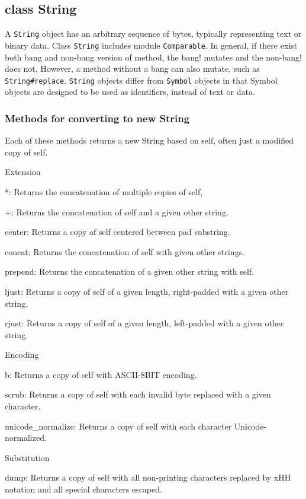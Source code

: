 \subsection{class String}
A \texttt{String} object has an arbitrary sequence of bytes, typically representing text or binary data.
Class \texttt{String} includes module \texttt{Comparable}.
In general, if there exist both bang and non-bang version of method, the bang! mutates and the non-bang! does not. However, a method without a bang can also mutate, such as \texttt{String#replace}.
\texttt{String} objects differ from \texttt{Symbol} objects in that Symbol objects are designed to be used as identifiers, instead of text or data.

\subsubsection{Methods for converting to new String}
Each of these methods returns a new String based on self, often just a modified copy of self.

Extension

*: Returns the concatenation of multiple copies of self,

+: Returns the concatenation of self and a given other string.

center: Returns a copy of self centered between pad substring.

concat: Returns the concatenation of self with given other strings.

prepend: Returns the concatenation of a given other string with self.

ljust: Returns a copy of self of a given length, right-padded with a given other string.

rjust: Returns a copy of self of a given length, left-padded with a given other string.

Encoding

b: Returns a copy of self with ASCII-8BIT encoding.

scrub: Returns a copy of self with each invalid byte replaced with a given character.

unicode\_normalize: Returns a copy of self with each character Unicode-normalized.


Substitution

dump: Returns a copy of self with all non-printing characters replaced by xHH notation and all special characters escaped.

